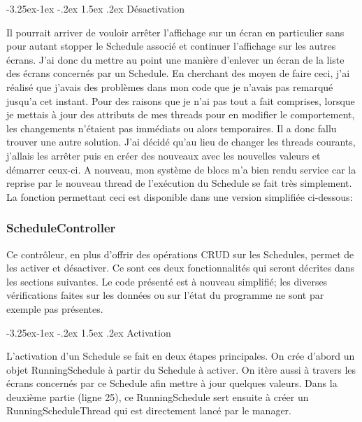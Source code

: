 \documentclass[french]{article}
\makeatletter
\renewcommand\paragraph{\@startsection{paragraph}{4}{\z@}%
                                     {-3.25ex\@plus -1ex \@minus -.2ex}%
                                     {1.5ex \@plus .2ex}%
                                     {\normalfont\normalsize\bfseries}}
\makeatother
\begin{document}
\paragraph{Désactivation}

Il pourrait arriver de vouloir arrêter l'affichage sur un écran en particulier sans pour autant stopper le Schedule associé et continuer l'affichage sur les autres écrans. J'ai donc du mettre au point une manière d'enlever un écran de la liste des écrans concernés par un Schedule. En cherchant des moyen de faire ceci, j'ai réalisé que j'avais des problèmes dans mon code que je n'avais pas remarqué jusqu'a cet instant. Pour des raisons que je n'ai pas tout a fait comprises, lorsque je mettais à jour des attributs de mes threads pour en modifier le comportement, les changements n'étaient pas immédiats ou alors temporaires. Il a donc fallu trouver une autre solution. J'ai décidé qu'au lieu de changer les threads courants, j'allais les arrêter puis en créer des nouveaux avec les nouvelles valeurs et démarrer ceux-ci. A nouveau, mon système de blocs m'a bien rendu service car la reprise par le nouveau thread de l'exécution du Schedule se fait très simplement. La fonction permettant ceci est disponible dans une version simplifiée ci-dessous:



\subsubsection{ScheduleController}

Ce contrôleur, en plus d'offrir des opérations CRUD sur les Schedules, permet de les activer et désactiver. Ce sont ces deux fonctionnalités qui seront décrites dans les sections suivantes. Le code présenté est à nouveau simplifié; les diverses vérifications faites sur les données ou sur l'état du programme ne sont par exemple pas présentes.

\paragraph{Activation}

L'activation d'un Schedule se fait en deux étapes principales. On crée d'abord un objet RunningSchedule à partir du Schedule à activer. On itère aussi à travers les écrans concernés par ce Schedule afin mettre à jour quelques valeurs. Dans la deuxième partie (ligne 25), ce RunningSchedule sert ensuite à créer un RunningScheduleThread qui est directement lancé par le manager.
\end{document}

